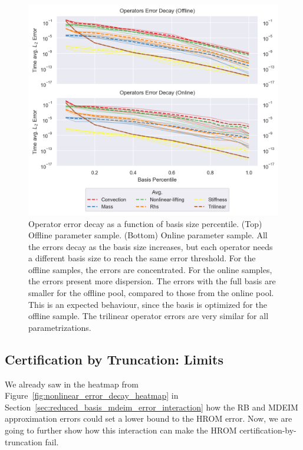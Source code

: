 \documentclass[../../thesis.tex]{subfiles}
\begin{document}
\begin{figure}[h]
    \includegraphics[width =\columnwidth]{research_project/piston/figures/nonlinear_displacement/separable/operators_error_decay_percentile.png}
    \caption{Operator error decay as a function of basis size percentile.
    (Top) Offline parameter sample.
    (Bottom) Online parameter sample.
    All the errors decay as the basis size increases, 
    but each operator needs a different basis size to reach the same error threshold.
    For the offline samples, the errors are concentrated.
    For the online samples, the errors present more dispersion.
    The errors with the full basis are smaller for the offline pool, 
    compared to those from the online pool.
    This is an expected behaviour, 
    since the basis is optimized for the offline sample.
    The trilinear operator errors are very similar for all parametrizations.}
    \label{fig:nlinear_disp_operators_error_decay}
\end{figure}

\clearpage
\subsection{Certification by Truncation: Limits}
We already saw in the heatmap from Figure~\ref{fig:nonlinear_error_decay_heatmap}
in Section~\ref{sec:reduced_basis_mdeim_error_interaction}
how the RB and MDEIM approximation errors could 
set a lower bound to the HROM error.
Now, we are going to further show how this interaction can make 
the HROM certification-by-truncation fail.
\end{document}
